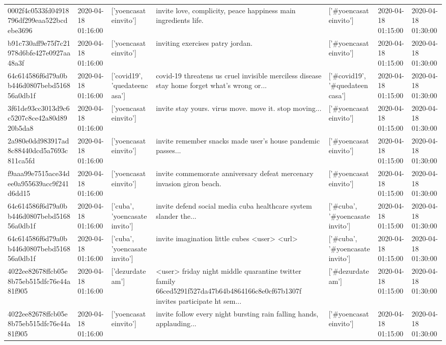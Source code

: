 \begin{tabular}{lllllll}
0002f4c0533fd04918796df299eaa522bcdebe3696 & 2020-04-18 01:16:00 & ['yoencasateinvito'] & invite love, complicity, peace happiness main ingredients life. & ['#yoencasateinvito'] & 2020-04-18 01:15:00 & 2020-04-18 01:30:00 \\
b91c730aff9e75f7c21978d6bfe427e0927aa48a3f & 2020-04-18 01:16:00 & ['yoencasateinvito'] & inviting exercises patry jordan. & ['#yoencasateinvito'] & 2020-04-18 01:15:00 & 2020-04-18 01:30:00 \\
64c614586f6d79a0bb446d0807bebd516856a0db1f & 2020-04-18 01:16:00 & ['covid19', 'quedateencasa'] & covid-19 threatens us cruel invisible merciless disease stay home forget what's wrong or... & ['#covid19', '#quedateencasa'] & 2020-04-18 01:15:00 & 2020-04-18 01:30:00 \\
3f61de93cc3013d9c6c5207c8ce42a80d8920b5da8 & 2020-04-18 01:16:00 & ['yoencasateinvito'] & invite stay yours. virus move. move it. stop moving... & ['#yoencasateinvito'] & 2020-04-18 01:15:00 & 2020-04-18 01:30:00 \\
2a980e0dd983917ad8c88440dcd5a7693c811ca5fd & 2020-04-18 01:16:00 & ['yoencasateinvito'] & invite remember snacks made user's house pandemic passes... & ['#yoencasateinvito'] & 2020-04-18 01:15:00 & 2020-04-18 01:30:00 \\
f9aaa99e7515ace34dee0a955639acc9f241d6dd15 & 2020-04-18 01:16:00 & ['yoencasateinvito'] & invite commemorate anniversary defeat mercenary invasion giron beach. & ['#yoencasateinvito'] & 2020-04-18 01:15:00 & 2020-04-18 01:30:00 \\
64c614586f6d79a0bb446d0807bebd516856a0db1f & 2020-04-18 01:16:00 & ['cuba', 'yoencasateinvito'] & invite defend social media cuba healthcare system slander the... & ['#cuba', '#yoencasateinvito'] & 2020-04-18 01:15:00 & 2020-04-18 01:30:00 \\
64c614586f6d79a0bb446d0807bebd516856a0db1f & 2020-04-18 01:16:00 & ['cuba', 'yoencasateinvito'] & invite imagination little cubes <user> <url> & ['#cuba', '#yoencasateinvito'] & 2020-04-18 01:15:00 & 2020-04-18 01:30:00 \\
4022ee82678ffcb05e8b75eb515dfc76e44a81f905 & 2020-04-18 01:16:00 & ['dezurdateam'] & <user> friday night middle quarantine twitter family 66ced5291f527da47b64b4864166c8e0cf67b1307f invites participate ht sem... & ['#dezurdateam'] & 2020-04-18 01:15:00 & 2020-04-18 01:30:00 \\
4022ee82678ffcb05e8b75eb515dfc76e44a81f905 & 2020-04-18 01:16:00 & ['yoencasateinvito'] & invite follow every night bursting rain falling hands, applauding... & ['#yoencasateinvito'] & 2020-04-18 01:15:00 & 2020-04-18 01:30:00 \\

\end{tabular}
